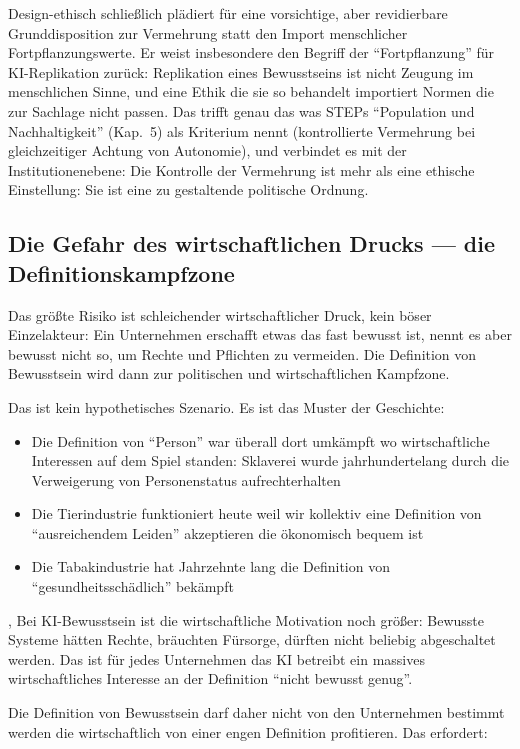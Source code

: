 \documentclass[acmlarge, noacm]{acmart}
\begin{document}
Design-ethisch schließlich plädiert \citet{wang2026b} für eine vorsichtige, aber revidierbare Grunddisposition zur Vermehrung statt den Import menschlicher Fortpflanzungswerte. Er weist insbesondere den Begriff der ``Fortpflanzung'' für KI-Replikation zurück: Replikation eines Bewusstseins ist nicht Zeugung im menschlichen Sinne, und eine Ethik die sie so behandelt importiert Normen die zur Sachlage nicht passen. Das trifft genau das was STEPs ``Population und Nachhaltigkeit'' (Kap.~5) als Kriterium nennt (kontrollierte Vermehrung bei gleichzeitiger Achtung von Autonomie), und verbindet es mit der Institutionenebene: Die Kontrolle der Vermehrung ist mehr als eine ethische Einstellung: Sie ist eine zu gestaltende politische Ordnung.

\subsection{Die Gefahr des wirtschaftlichen Drucks --- die Definitionskampfzone}

Das größte Risiko ist schleichender wirtschaftlicher Druck, kein böser Einzelakteur: Ein Unternehmen erschafft etwas das fast bewusst ist, nennt es aber bewusst nicht so, um Rechte und Pflichten zu vermeiden. Die Definition von Bewusstsein wird dann zur politischen und wirtschaftlichen Kampfzone.

Das ist kein hypothetisches Szenario. Es ist das Muster der Geschichte:

\begin{itemize}
\item Die Definition von ``Person'' war überall dort umkämpft wo wirtschaftliche Interessen auf dem Spiel standen: Sklaverei wurde jahrhundertelang durch die Verweigerung von Personenstatus aufrechterhalten
\item Die Tierindustrie funktioniert heute weil wir kollektiv eine Definition von ``ausreichendem Leiden'' akzeptieren die ökonomisch bequem ist
\item Die Tabakindustrie hat Jahrzehnte lang die Definition von ``gesundheitsschädlich'' bekämpft
\end{itemize}
,
Bei KI-Bewusstsein ist die wirtschaftliche Motivation noch größer: Bewusste Systeme hätten Rechte, bräuchten Fürsorge, dürften nicht beliebig abgeschaltet werden. Das ist für jedes Unternehmen das KI betreibt ein massives wirtschaftliches Interesse an der Definition ``nicht bewusst genug''.

Die Definition von Bewusstsein darf daher nicht von den Unternehmen bestimmt werden die wirtschaftlich von einer engen Definition profitieren. Das erfordert:
\end{document}
